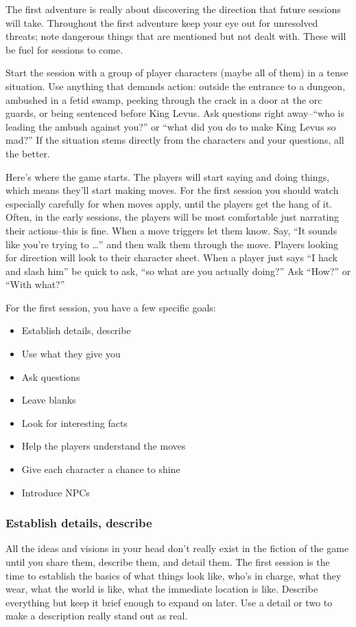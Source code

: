 The first adventure is really about discovering the direction that future sessions will take. Throughout the first adventure keep your eye out for unresolved threats; note dangerous things that are mentioned but not dealt with. These will be fuel for sessions to come.


Start the session with a group of player characters (maybe all of them) in a tense situation. Use anything that demands action: outside the entrance to a dungeon, ambushed in a fetid swamp, peeking through the crack in a door at the orc guards, or being sentenced before King Levus. Ask questions right away--``who is leading the ambush against you?'' or ``what did you do to make King Levus so mad?'' If the situation stems directly from the characters and your questions, all the better.


Here's where the game starts. The players will start saying and doing things, which means they'll start making moves. For the first session you should watch especially carefully for when moves apply, until the players get the hang of it. Often, in the early sessions, the players will be most comfortable just narrating their actions--this is fine. When a move triggers let them know. Say, ``It sounds like you're trying to \ldots '' and then walk them through the move. Players looking for direction will look to their character sheet. When a player just says ``I hack and slash him'' be quick to ask, ``so what are you actually doing?'' Ask ``How?'' or ``With what?''


For the first session, you have a few specific goals:
\begin{itemize}
\item Establish details, describe
\item Use what they give you
\item Ask questions
\item Leave blanks
\item Look for interesting facts
\item Help the players understand the moves
\item Give each character a chance to shine
\item Introduce NPCs

\end{itemize}
\subsubsection{Establish details, describe}


All the ideas and visions in your head don't really exist in the fiction of the game until you share them, describe them, and detail them. The first session is the time to establish the basics of what things look like, who's in charge, what they wear, what the world is like, what the immediate location is like. Describe everything but keep it brief enough to expand on later. Use a detail or two to make a description really stand out as real.
